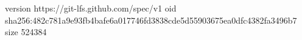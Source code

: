 version https://git-lfs.github.com/spec/v1
oid sha256:482c781a9e93fb4bafe6a017746fd3838cde5d55903675ea0dfc4382fa3496b7
size 524384
